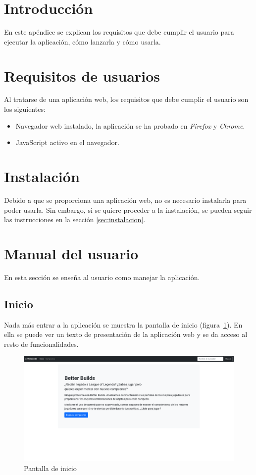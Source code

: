 
\section{Introducción}
En este apéndice se explican los requisitos que debe cumplir el usuario para ejecutar la aplicación, cómo lanzarla y cómo usarla.

\section{Requisitos de usuarios}
Al tratarse de una aplicación web, los requisitos que debe cumplir el usuario son los siguientes:

\begin{itemize}
	\tightlist
	\item Navegador web instalado, la aplicación se ha probado en \textit{Firefox} y \textit{Chrome}.
	\item JavaScript activo en el navegador.
\end{itemize}


\section{Instalación}
Debido a que se proporciona una aplicación web, no es necesario instalarla para poder usarla. Sin embargo, si se quiere proceder a la instalación, se pueden seguir las instrucciones en la sección \ref{sec:instalacion}.


\section{Manual del usuario}
En esta sección se enseña al usuario como manejar la aplicación.

\subsection{Inicio}
Nada más entrar a la aplicación se muestra la pantalla de inicio (figura~\ref{fig:inicio}). En ella se puede ver un texto de presentación de la aplicación web y se da acceso al resto de funcionalidades.

\begin{figure}[h]
	\centering
	\includegraphics[width=1\linewidth]{img/0.inicio}
	\caption{Pantalla de inicio}
	\label{fig:inicio}
\end{figure}

